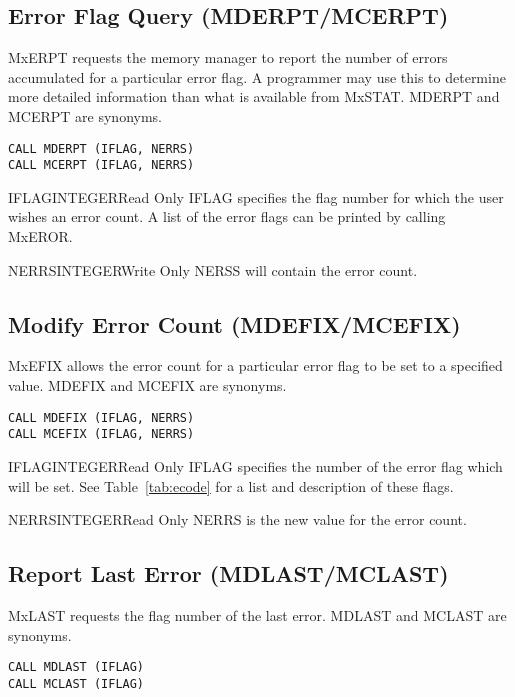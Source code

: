 \subsection{Error Flag Query (MDERPT/MCERPT)}
MxERPT requests the memory manager to report the number of errors
accumulated for a particular error flag. A programmer may use this to
determine more detailed information than what is available from
MxSTAT. MDERPT and MCERPT are synonyms.
\begin{verbatim}
CALL MDERPT (IFLAG, NERRS)
CALL MCERPT (IFLAG, NERRS)
\end{verbatim}

\begin{argy}{IFLAG}{INTEGER}{Read Only}
IFLAG specifies the flag number for which the user wishes an error count. A
list of the error flags can be printed by calling MxEROR.
\end{argy}

\begin{argy}{NERRS}{INTEGER}{Write Only}
NERSS will contain the error count.
\end{argy}

\subsection{Modify Error Count (MDEFIX/MCEFIX)}
MxEFIX allows the error count for a particular error flag to be
set to a specified value. MDEFIX and MCEFIX are synonyms.
\begin{verbatim}
CALL MDEFIX (IFLAG, NERRS)
CALL MCEFIX (IFLAG, NERRS)
\end{verbatim}

\begin{argy}{IFLAG}{INTEGER}{Read Only}
IFLAG specifies the number of the error flag which will be set.
See Table~\ref{tab:ecode} for a list and description of these flags.
\end{argy}

\begin{argy}{NERRS}{INTEGER}{Read Only}
NERRS is the new value for the error count.
\end{argy}

\subsection{Report Last Error (MDLAST/MCLAST)}
MxLAST requests the flag number of the last error.
MDLAST and MCLAST are synonyms.
\begin{verbatim}
CALL MDLAST (IFLAG)
CALL MCLAST (IFLAG)
\end{verbatim}

